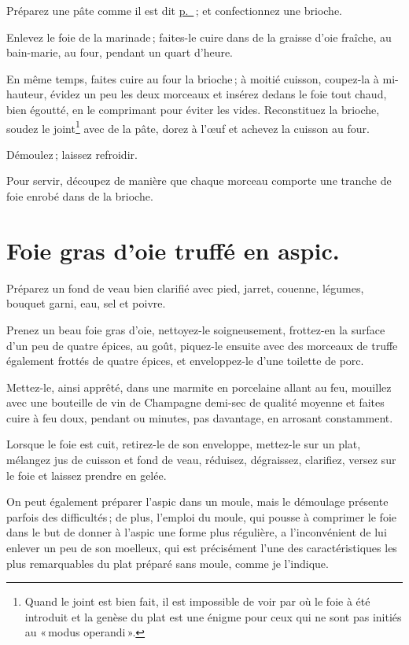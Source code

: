 Préparez une pâte comme il est dit \hyperlink{p0371}{p. \pageref{pg0371}} ; et
confectionnez une brioche.

Enlevez le foie de la marinade ; faites-le cuire dans de la graisse d'oie
fraîche, au bain-marie, au four, pendant un quart d'heure.

En même temps, faites cuire au four la brioche ; à moitié cuisson, coupez-la
à mi-hauteur, évidez un peu les deux morceaux et insérez dedans le foie tout
chaud, bien égoutté, en le comprimant pour éviter les vides. Reconstituez la
brioche, soudez le joint\footnote{Quand le joint est bien fait, il est
impossible de voir par où le foie à été introduit et la genèse du plat est une
énigme pour ceux qui ne sont pas initiés au « modus operandi ».} avec de la
pâte, dorez à l'œuf et achevez la cuisson au four.

Démoulez ; laissez refroidir.

Pour servir, découpez de manière que chaque morceau comporte une tranche
de foie enrobé dans de la brioche.

\section*{\centering Foie gras d’oie truffé en aspic.}
{}
\label{pg0596} \hypertarget{p0596}{}

Préparez un fond de veau bien clarifié avec pied, jarret, couenne, légumes,
bouquet garni, eau, sel et poivre.

Prenez un beau foie gras d’oie, nettoyez-le soigneusement, frottez-en la
surface d'un peu de quatre épices, au goût, piquez-le ensuite avec des morceaux
de truffe également frottés de quatre épices, et enveloppez-le d'une toilette
de porc.

Mettez-le, ainsi apprêté, dans une marmite en porcelaine allant au feu,
mouillez avec une bouteille de vin de Champagne demi-sec de qualité moyenne et
faites cuire à feu doux, pendant {\mmm} ou {\mmm} minutes, pas davantage, en arrosant
constamment.

Lorsque le foie est cuit, retirez-le de son enveloppe, mettez-le sur un plat,
mélangez jus de cuisson et fond de veau, réduisez, dégraissez, clarifiez,
versez sur le foie et laissez prendre en gelée.

On peut également préparer l'aspic dans un moule, mais le démoulage présente
parfois des difficultés ; de plus, l'emploi du moule, qui pousse à comprimer le
foie dans le but de donner à l’aspic une forme plus régulière, a l'inconvénient
de lui enlever un peu de son moelleux, qui est précisément l'une des
caractéristiques les plus remarquables du plat préparé sans moule, comme je
l'indique.

